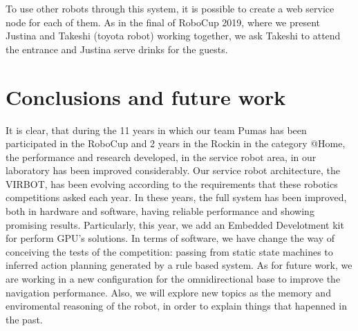 \documentclass{llncs}
\begin{document}
To use other robots through this system, 
it is possible to create a web service node for each of them. 
As in the final of RoboCup 2019, where we present Justina and Takeshi (toyota robot) working together, 
we ask Takeshi to attend the entrance and Justina serve drinks for the guests.



 





\section{Conclusions and future work}\label{sec:conclusions}
It is clear, that during the 11 years in which our team Pumas has been participated in the RoboCup and 2 years in the Rockin \cite{Robocup_2017} in the category @Home, the performance and research developed, in the service robot area, in our laboratory has been improved considerably.
Our service robot architecture, the VIRBOT, has been evolving according to the requirements that these robotics competitions asked each year.
In these years, the full system has been improved, both in hardware and software, having reliable performance and showing promising results. Particularly, this year, we add an Embedded Develotment kit \cite{jetson} for perform GPU's solutions.
In terms of software, we have change the way of conceiving the tests of the competition: passing from static state machines to inferred action planning generated by a rule based system. 
As for future work, we are working in a new configuration for the omnidirectional base to improve the navigation performance. Also, we will explore new topics as the memory and enviromental reasoning of the robot, in order to explain things that hapenned in the past.


\end{document}
